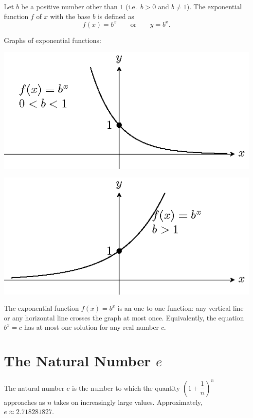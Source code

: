 \documentclass[en,12pt]{elegantbook}
\newenvironment{rmdnote}{
    \par\noindent
    \makebox[-\width][r]{
    \tiny\color{red!90}
    \textdbend
    \hspace*{2pt}
    }
    \makebox[\width][l]{
        \hspace*{3pt}
        \textbf{
            \color{second}
            Note 
        }
    }
    \begin{shaded}
    \itshape
}{
    \par
    \end{shaded}
}
\begin{document}
Let \(b\) be a positive number other than \(1\) (i.e.~\(b>0\) and \(b\neq 1\)). The exponential function \(f\) of \(x\) with the base \(b\) is defined as
\[
f(x)=b^x\quad\quad\text{or}\quad\quad y=b^x.
\]

Graphs of exponential functions:

\begin{multicols}{2}

\begin{center}\includegraphics[width=0.5\linewidth]{figs/tikz-example-exp-function-1} \end{center}

\begin{center}\includegraphics[width=0.5\linewidth]{figs/tikz-example-exp-function-2} \end{center}

\end{multicols}

\begin{rmdnote}

The exponential function \(f(x)=b^x\) is an one-to-one function: any vertical line or any horizontal line crosses the graph at most once. Equivalently, the equation \(b^x=c\) has at most one solution for any real number \(c\).

\end{rmdnote}

\hypertarget{the-natural-number-e}{%
\section{\texorpdfstring{The Natural Number \(e\)}{The Natural Number e}}\label{the-natural-number-e}}

The natural number \(e\) is the number to which the quantity \(\left(1+\dfrac1n\right)^n\) approaches as \(n\) takes on increasingly large values. Approximately, \(e\approx2.718281827\).
\end{document}
